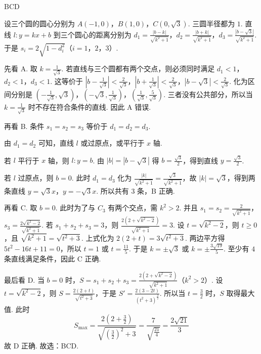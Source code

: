 \documentclass[UTF8,a4paper,oneside,11pt]{ctexbook}
\begin{document}
\begin{answer}
BCD
\end{answer}

\begin{solution}
设三个圆的圆心分别为 \(A(-1,0)\)，\(B(1,0)\)，\(C(0,\sqrt{3})\). 三圆半径都为 \(1\). 直线 \(l:y=kx+b\) 到三个圆心的距离分别为 \(d_1=\frac{\left| b-k \right|}{\sqrt{k^2+1}}\)，\(d_2=\frac{\left| b+k \right|}{\sqrt{k^2+1}}\)，\(d_3=\frac{\left| b-\sqrt{3} \right|}{\sqrt{k^2+1}}\). 于是 \(s_i=2\sqrt{1-d_i^2}\)（\(i=1\)，\(2\)，\(3\)）.

先看 A. 取 \(k=\frac{1}{\sqrt{3}}\). 若直线与三个圆都有两个交点，则必须同时满足 \(d_1<1\)，\(d_2<1\)，\(d_3<1\). 这等价于 \(\left| b-\frac{1}{\sqrt{3}} \right|<\frac{2}{\sqrt{3}}\)，\(\left| b+\frac{1}{\sqrt{3}} \right|<\frac{2}{\sqrt{3}}\)，\(\left| b-\sqrt{3} \right|<\frac{2}{\sqrt{3}}\). 化为区间分别是 \(\left( -\frac{1}{\sqrt{3}},\sqrt{3} \right)\)，\(\left( -\sqrt{3},\frac{1}{\sqrt{3}} \right)\)，\(\left( \frac{1}{\sqrt{3}},\frac{5}{\sqrt{3}} \right)\).
三者没有公共部分，所以当 \(k=\frac{1}{\sqrt{3}}\) 时不存在符合条件的直线. 因此 A 错误.

再看 B. 条件 \(s_1=s_2=s_3\) 等价于 \(d_1=d_2=d_3\).

由 \(d_1=d_2\) 可知，直线 \(l\) 或过原点，或平行于 \(x\) 轴.

若 \(l\) 平行于 \(x\) 轴，则 \(l:y=b\). 由 \(\left| b \right|=\left| b-\sqrt{3} \right|\) 得 \(b=\frac{\sqrt{3}}{2}\)，得到直线 \(y=\frac{\sqrt{3}}{2}\).

若 \(l\) 过原点，则 \(b=0\). 此时 \(d_1=d_3\) 化为 \(\frac{\left| k \right|}{\sqrt{k^2+1}}=\frac{\sqrt{3}}{\sqrt{k^2+1}}\)，故 \(\left| k \right|=\sqrt{3}\)，得到两条直线 \(y=\sqrt{3}x\)，\(y=-\sqrt{3}x\).
所以共有 \(3\) 条，B 正确.

再看 C. 取 \(b=0\). 此时为了与 \(C_3\) 有两个交点，需 \(k^2>2\). 并且 \(s_1=s_2=\frac{2}{\sqrt{k^2+1}}\)，\(s_3=\frac{2\sqrt{k^2-2}}{\sqrt{k^2+1}}\). 若 \(s_1+s_2+s_3=3\)，则 \(\frac{2\left( 2+\sqrt{k^2-2} \right)}{\sqrt{k^2+1}}=3\). 设 \(t=\sqrt{k^2-2}\)，则 \(t\ge 0\)，且 \(\sqrt{k^2+1}=\sqrt{t^2+3}\). 上式化为 \(2\left( 2+t \right)=3\sqrt{t^2+3}\).
两边平方得 \(5t^2-16t+11=0\)，所以 \(t=1\) 或 \(t=\frac{11}{5}\). 于是 \(k=\pm \sqrt{3}\) 或 \(k=\pm \frac{3\sqrt{19}}{5}\).
至少有 \(4\) 条直线满足条件，因此 C 正确.

最后看 D. 当 \(b=0\) 时，\(S=s_1+s_2+s_3=\frac{2\left( 2+\sqrt{k^2-2} \right)}{\sqrt{k^2+1}}\)（\(k^2>2\)）. 设 \(t=\sqrt{k^2-2}\)，则 \(S=\frac{2\left( 2+t \right)}{\sqrt{t^2+3}}\)，于是 \(S'=\frac{2\left( 3-2t \right)}{\left( t^2+3 \right)^{\frac{3}{2}}}\).
所以当 \(t=\frac{3}{2}\) 时，\(S\) 取得最大值. 此时
\[
S_{\max}=\frac{2\left( 2+\frac{3}{2} \right)}{\sqrt{\left( \frac{3}{2} \right)^2+3}}=\frac{7}{\sqrt{\frac{21}{4}}}=\frac{2\sqrt{21}}{3}
\]
故 D 正确.
故选：BCD.
\end{solution}
\end{document}

